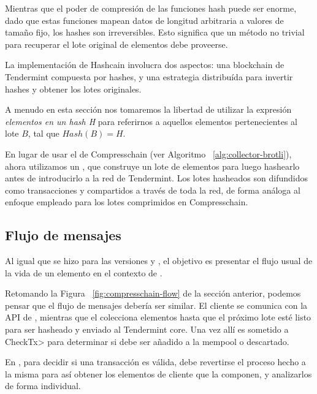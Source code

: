 %
Mientras que el poder de compresión de las funciones hash puede ser enorme, dado que estas funciones
mapean datos de longitud arbitraria a valores de tamaño fijo, los hashes son irreversibles. Esto
significa que un método no trivial para recuperar el lote original de elementos debe proveerse.

La implementación de Hashcain involucra dos aspectos: una blockchain de Tendermint compuesta por hashes,
y una estrategia distribuída para invertir hashes y obtener los lotes originales.
%

A menudo en esta sección nos tomaremos la libertad de utilizar la expresión \textit{elementos en un hash H}
para referirnos a aquellos elementos pertenecientes al lote $B$, tal que $Hash(B) = H$.

En lugar de usar el \collector de Compresschain (ver Algoritmo ~\ref{alg:collector-brotli}),
ahora utilizamos un \hcollector, que construye un lote de elementos para luego hashearlo
antes de introducirlo a la red de Tendermint.
%
Los lotes hasheados son difundidos como transacciones y compartidos a través de toda la red, de forma
análoga al enfoque empleado para los lotes comprimidos en Compresschain.

\subsection{Flujo de mensajes}

Al igual que se hizo para las versiones \vanilla y \compresschain, el objetivo es presentar el flujo usual
de la vida de un elemento en el contexto de \hashchain.

%

Retomando la Figura ~\ref{fig:compresschain-flow} de la sección anterior, podemos pensar que el flujo de mensajes
debería ser similar. El cliente se comunica con la API de \setchain, mientras que el \hcollector colecciona elementos
hasta que el próximo lote esté listo para ser hasheado y enviado al Tendermint core.
Una vez allí es sometido a
\<CheckTx> para determinar si debe ser añadido a la mempool o descartado.

%

En \compresschain, para decidir si una transacción es válida, debe revertirse el proceso hecho a la misma para
así obtener los elementos de cliente que la componen, y analizarlos de forma individual.

